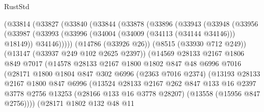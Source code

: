 \begin{lexlean}{RustStd}
\begin{coremodule}
                (@33814
                  (@33827
                    (@33840
                      (@33844
                        (@33878
                          (@33896
                            (@33943
                              (@33948
                                (@33956
                                  (@33987
                                    (@33993
                                      (@33996 (@34004 (@34009 (@34113 (@34144 @34146))) @18149))
                                      @34146)))))
                            (@14786 (@33926 @26))
                            (@8515 (@33930 @712 @249))
                            (@13147 (@33937 @249 @102 @2625 @2397))
                            (@14569
                              @28133
                              @2167
                              @1806
                              @849
                              @7017
                              (@14578
                                @28133
                                @2167
                                @1800
                                @1802
                                @847
                                @48
                                @6996
                                @7016
                                (@28171
                                  @1800
                                  @1804
                                  @847
                                  @302
                                  @6996
                                  (@2363 @7016 @2374)
                                  (@13193
                                    @28133
                                    @2167
                                    @1800
                                    @847
                                    @6996
                                    (@13524
                                      @28133
                                      @2167
                                      @262
                                      @847
                                      @133
                                      @16
                                      @2397
                                      @3778
                                      @2756
                                      @13253
                                      (@28166 @133 @16 @3778 @28207)
                                      (@13558 (@15956 @847 @2756))))
                                  (@28171
                                    @1802
                                    @132
                                    @48
                                    @11

\end{coremodule}
\end{lexlean}

